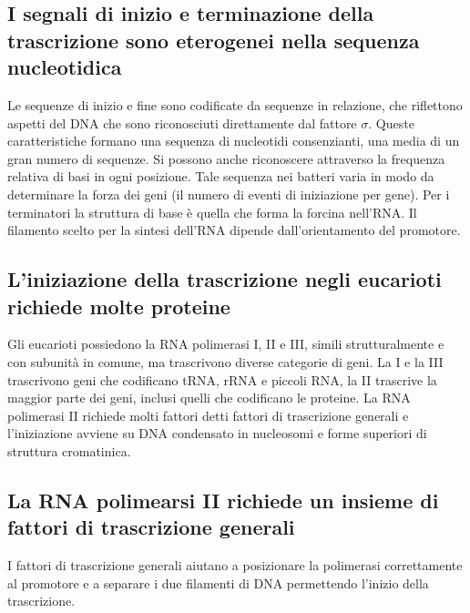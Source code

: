 \subsection{I segnali di inizio e terminazione della trascrizione sono eterogenei nella sequenza nucleotidica}
Le sequenze di inizio e fine sono codificate da sequenze in relazione, che riflettono aspetti del DNA che sono riconosciuti direttamente dal fattore $\sigma$. Queste caratteristiche 
formano una sequenza di nucleotidi consenzianti, una media di un gran numero di sequenze. Si possono anche riconoscere attraverso la frequenza relativa di basi in ogni posizione. Tale
sequenza nei batteri varia in modo da determinare la forza dei geni (il numero di eventi di iniziazione per gene). Per i terminatori la struttura di base \`e quella che forma la 
forcina nell'RNA. Il filamento scelto per la sintesi dell'RNA dipende dall'orientamento del promotore. 
\subsection{L'iniziazione della trascrizione negli eucarioti richiede molte proteine}
Gli eucarioti possiedono la RNA polimerasi I, II e III, simili strutturalmente e con subunit\`a in comune, ma trascrivono diverse categorie di geni. La I e la III trascrivono geni che 
codificano tRNA, rRNA e piccoli RNA, la II trascrive la maggior parte dei geni, inclusi quelli che codificano le proteine. La RNA polimerasi II  richiede molti fattori detti fattori di 
trascrizione generali e l'iniziazione avviene su DNA condensato in nucleosomi e forme superiori di struttura cromatinica. 
\subsection{La RNA polimearsi II richiede un insieme di fattori di trascrizione generali}
I fattori di trascrizione generali aiutano a posizionare la polimerasi correttamente al promotore e a separare i due filamenti di DNA permettendo l'inizio della trascrizione. 

